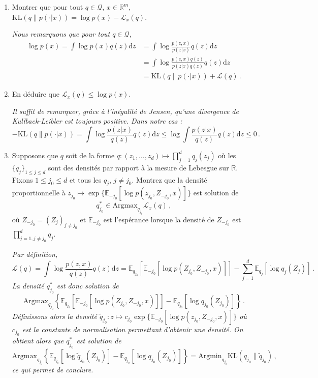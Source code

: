 \documentclass[a4paper,10pt,fleqn]{article}
\newcommand{\eqsp}{\,}
\newcommand{\rset}{\ensuremath{\mathbb{R}}}
\newcommand{\1}{\ensuremath{\mathbbm{1}}}
\begin{document}
\begin{enumerate}
\item Montrer que pour tout $q\in\mathcal{Q}$, $x\in\rset^m$, $\mathrm{KL}(q\|p(\cdot|x)) = \log p(x) - \mathcal{L}_x(q) $.

\vspace{.2cm}

{\em
Nous remarquons que pour tout $q\in\mathcal{Q}$,
\begin{align*}
\log p(x) = \int \log p(x) q(z) \mathrm{d} z &= \int \log \frac{p(z,x)}{p(z|x)} q(z) \mathrm{d} z\\
&  = \int \log \frac{p(z,x)q(z)}{p(z|x)q(z)} q(z) \mathrm{d} z\\
&= \mathrm{KL}(q\|p(\cdot|x)) + \mathcal{L}(q)  \,.
\end{align*}
}
\item En d\'eduire que $\mathcal{L}_x(q) \leq \log p(x)$.

\vspace{.2cm}

{\em
Il suffit de remarquer, gr\^ace \`a l'in\'egalit\'e de Jensen, qu'une divergence de Kullback-Leibler est toujours positive. Dans notre cas :
$$
-\mathrm{KL}(q\|p(\cdot|x))  =  \int \log \frac{p(z|x)}{q(z)} q(z) \mathrm{d} z \leq  \log \int \frac{p(z|x)}{q(z)} q(z) \mathrm{d} z \leq 0\,.
$$
}
\item Supposons que $q$ soit de la forme $q:(z_1,\ldots,z_d)\mapsto \prod_{j=1}^dq_j(z_j)$ o\`u les $\{q_j\}_{1\leq j\leq d}$ sont des densit\'es par rapport \`a la mesure de Lebesgue sur $\rset$. Fixons $1\leq j_0 \leq d$ et tous les $q_j$, $j\neq j_0$. Montrez que la densit\'e proportionnelle \`a $z_{j_0} \mapsto \exp\{\mathbb{E}_{-j_0}[\log p (z_{j_0},Z_{-j_0},x)]\}$ est solution de 
$$
q_{j_0}^* \in \mathrm{Argmax}_{q_{j_0}} \mathcal{L}_x(q)\eqsp,
$$
o\`u $Z_{-j_0} = (Z_j)_{j\neq j_0}$ et $\mathbb{E}_{-j_0}$ est l'esp\'erance lorsque la densit\'e de $Z_{-j_0}$ est $\prod_{j=1,j\neq j_0}^dq_j$.

\vspace{.2cm}

{\em
Par d\'efinition,
$$
\mathcal{L}(q)  = \int \log\frac{p(z,x)}{q(z)}q(z) \mathrm{d} z = \mathbb{E}_{q_{j_0}}\left[\mathbb{E}_{-j_0}\left[\log p(Z_{j_0},Z_{-j_0},x)\right]\right] - \sum_{j=1}^d\mathbb{E}_{q_j}\left[\log q_j(Z_j)\right]\,.
$$
La densit\'e $q_{j_0}^*$ est donc solution de 
$$
\mathrm{Argmax}_{q_{j_0}} \left\{\mathbb{E}_{q_{j_0}}\left[\mathbb{E}_{-j_0}\left[\log p(Z_{j_0},Z_{-j_0},x)\right]\right] - \mathbb{E}_{q_{j_0}}\left[\log q_{j_0}(Z_{j_0})\right]\right\}\eqsp.
$$ 
D\'efinissons alors la densit\'e $\tilde q_{j_0}:z\mapsto c_{j_0}\exp\{\mathbb{E}_{-j_0}[\log p (z_{j_0},Z_{-j_0},x)]\}$ o\`u $c_{j_0}$ est la constante de normalisation permettant d'obtenir une densit\'e. On obtient alors que $q_{j_0}^*$ est  solution de
$$
\mathrm{Argmax}_{q_{j_0}} \left\{\mathbb{E}_{q_{j_0}}\left[\log \tilde q_{j_0}(Z_{j_0})\right] - \mathbb{E}_{q_{j_0}}\left[\log q_{j_0}(Z_{j_0})\right]\right\} = \mathrm{Argmin}_{q_{j_0}} \mathrm{KL}(q_{j_0}\|\tilde q_{j_0})  \,,
$$ 
ce qui permet de conclure.
}


\end{enumerate}
\end{document}
